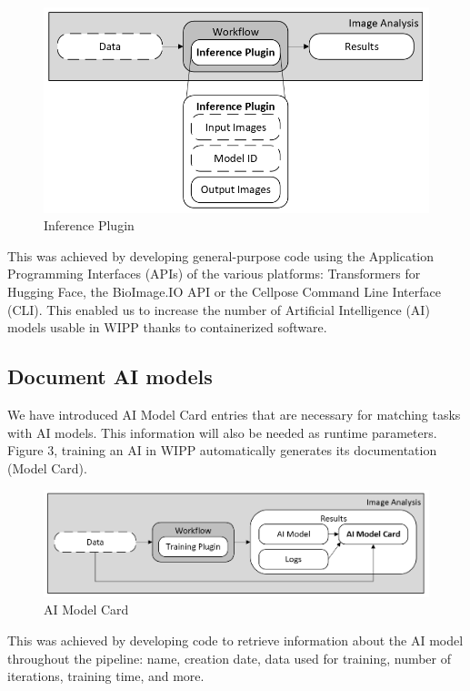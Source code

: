 \begin{figure}[H]
  \centering
  \includegraphics[width=1.0\linewidth]{png/2_inference_plugin.png}
  \caption{Inference Plugin}
  \label{fig:2inference}
\end{figure}

This was achieved by developing general-purpose code using the Application
Programming Interfaces (APIs) of the various platforms: Transformers for Hugging
Face, the BioImage.IO API or the Cellpose Command Line Interface (CLI). This
enabled us to increase the number of Artificial Intelligence (AI) models usable
in WIPP thanks to containerized software.

\subsection{Document AI models}

We have introduced AI Model Card entries that are necessary for matching tasks
with AI models. This information will also be needed as runtime parameters.
Figure 3, training an AI in WIPP automatically generates its documentation
(Model Card).

\begin{figure}[H]
  \centering
  \includegraphics[width=1.0\linewidth]{png/3_ai_model_card.png}
  \caption{AI Model Card}
  \label{fig:3aimodelcard}
\end{figure}

This was achieved by developing code to retrieve information about the AI model
throughout the pipeline: name, creation date, data used for training, number of
iterations, training time, and more.

